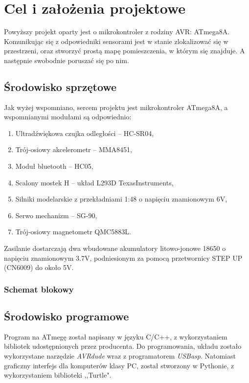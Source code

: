 \section{Cel i założenia projektowe}
    \tab Powyższy projekt oparty jest o mikrokontroler z rodziny AVR: ATmega8A.
    Komunikując się z odpowiedniki sensorami jest w stanie zlokalizować się w przestrzeni,
    oraz stworzyć prostą mapę pomieszczenia, w którym się znajduje. A następnie swobodnie poruszać się po nim.

    \subsection{Środowisko sprzętowe}
        \tab Jak wyżej wspomniano, sercem projektu jest mikrokontroler ATmega8A, a wspomnianymi modułami są odpowiednio:
        \begin{enumerate}
            \item Ultradźwiękowa czujka odległości -- HC-SR04,
            \item Trój-osiowy akcelerometr -- MMA8451,
            \item Moduł bluetooth -- HC05,
            \item Scalony mostek H -- układ L293D TexasInstruments,
            \item Silniki modelarskie z przekładniami 1:48 o napięciu znamionowym 6V,
            \item Serwo mechanizm -- SG-90,
            \item Trój-osiowy magnetometr QMC5883L.
        \end{enumerate}
% 
        Zasilanie dostarczają dwa wbudowane akumulatory litowo-jonowe 18650 o napięciu znamionowym 3.7V, podniesionym za pomocą przetwornicy STEP UP (CN6009) do około 5V.


    \newpage
        \subsubsection{Schemat blokowy}
            
        
    \subsection{Środowisko programowe}
        \tab Program na ATmegę został napisany w języku C/C++, z wykorzystaniem bibliotek udostępnionych przez producenta.
        Do programowania, układu zostało wykorzystane narzędzie \textit{AVRdude} wraz z programatorem \textit{USBasp}.
        Natomiast graficzny interfejs dla komputerów klasy PC, został stworzony w Pythonie, z wykorzystaniem biblioteki ,,Turtle".
